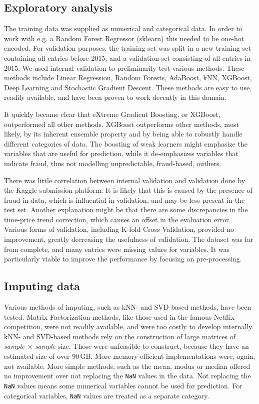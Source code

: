 \documentclass[a4paper,11pt,twocolumn]{article}
\begin{document}
\subsection{Exploratory analysis}
The training data was supplied as numerical and categorical data. In order to
work with e.g. a Random Forest Regressor (sklearn) this needed to be one-hot
encoded. For validation purposes, the training set was split in a new training
set containing all entries before 2015, and a validation set consisting of all
entries in 2015. We used internal validation to preliminarily test various
methods. These methods include Linear Regression, Random Forests, AdaBoost, kNN,
XGBoost, Deep Learning and Stochastic Gradient Descent. These methods are easy
to use, readily available, and have been proven to work decently in this domain.

It quickly became clear that eXtreme Gradient Boosting, or XGBoost, outperformed
all other methods. XGBoost outperforms other methods, most likely, by its
inherent ensemble property and by being able to robustly handle different
categories of data. The boosting of weak learners might emphasize the variables
that are useful for prediction, while it de-emphasizes variables that indicate
fraud, thus not modelling unpredictable, fraud-based, outliers.

There was little correlation between internal validation and validation done by
the Kaggle submission platform. It is likely that this is caused by the
presence of fraud in data, which is influential in validation, and may be less
present in the test set. Another explanation might be that there are some
discrepancies in the time-price trend correction, which causes an offset in the
evaluation error. Various forms of validation, including K-fold Cross
Validation, provided no improvement, greatly decreasing the usefulness of
validation. The dataset was far from complete, and many entries were missing
values for variables. It was particularly viable to improve the performance by focusing on
pre-processing.

\subsection{Imputing data}
Various methods of imputing, such as kNN- and SVD-based methods, have been
tested. Matrix Factorization methods, like those used in the famous Netflix
competition, were not readily available, and were too costly to develop
internally. kNN- and SVD-based methods rely on the construction of large
matrices of \emph{sample} $\times$ \emph{sample} size. Those were unfeasible to construct,
because they have an estimated size of over 90\,GB. More memory-efficient
implementations were, again, not available. More simple methods, such as the
mean, modus or median offered no improvement over not replacing the \texttt{NaN}
values in the data. Not replacing the \texttt{NaN} values means some numerical
variables cannot be used for prediction. For categorical variables,
\texttt{NaN} values are treated as a separate category.
\end{document}
